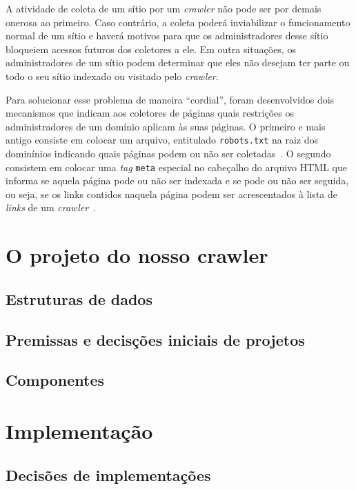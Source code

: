 \documentclass[10pt,twocolumn]{article}
\begin{document}
A atividade de coleta de um sítio por um \emph{crawler} não pode ser por
demais onerosa ao primeiro. Caso contrário, a coleta poderá inviabilizar
o funcionamento normal de um sítio e haverá motivos para que os
administradores desse sítio bloqueiem acessos futuros dos coletores a
ele. Em outra situações, os administradores de um sítio podem determinar
que eles não desejam ter parte ou todo o seu sítio indexado ou visitado
pelo \emph{crawler}.

Para solucionar esse problema de maneira ``cordial'', foram
desenvolvidos dois mecanismos que indicam aos coletores de páginas quais
restrições os administradores de um domínio aplicam às suas páginas. O
primeiro e mais antigo consiste em colocar um arquivo, entitulado
\texttt{robots.txt} na raiz dos dominínios indicando quais páginas podem
ou não ser coletadas~\cite{robotstxt}. O segundo consistem em colocar
uma \emph{tag} \texttt{meta} especial no cabeçalho do arquivo HTML que
informa se aquela página pode ou não ser indexada e se pode ou não ser
seguida, ou seja, se os links contidos naquela página podem ser
acrescentados à lista de \emph{links} de um
\emph{crawler}~\cite{robotsmeta}.



\section{O projeto do nosso crawler}

\subsection{Estruturas de dados}
\subsection{Premissas e decisções iniciais de projetos}
\subsection{Componentes}

\section{Implementação}
\subsection{Decisões de implementações}
\end{document}
